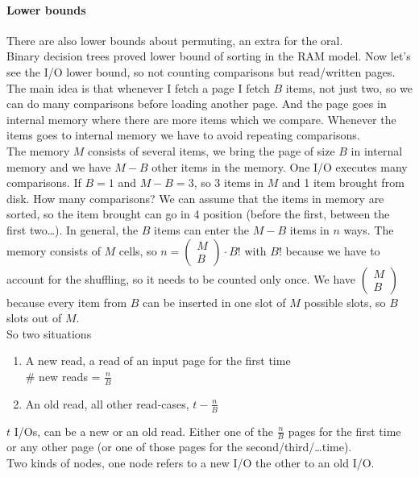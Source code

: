 \documentclass[10pt]{report}
\begin{document}
\paragraph{Lower bounds} There are also lower bounds about permuting, an extra for the oral.\\
Binary decision trees proved lower bound of sorting in the RAM model. Now let's see the I/O lower bound, so not counting comparisons but read/written pages. The main idea is that whenever I fetch a page I fetch $B$ items, not just two, so we can do many comparisons before loading another page. And the page goes in internal memory where there are more items which we compare. Whenever the items goes to internal memory we have to avoid repeating comparisons.\\
The memory $M$ consists of several items, we bring the page of size $B$ in internal memory and we have $M-B$ other items in the memory. One I/O executes many comparisons. If $B = 1$ and $M - B = 3$, so 3 items in $M$ and 1 item brought from disk. How many comparisons? We can assume that the items in memory are sorted, so the item brought can go in 4 position (before the first, between the first two\ldots). In general, the $B$ items can enter the $M-B$ items in $n$ ways. The memory consists of $M$ cells, so $n = \left(\begin{array}{c}
M\\B
\end{array}\right)\cdot B!$ with $B!$ because we have to account for the shuffling, so it needs to be counted only once. We have $\left(\begin{array}{c}
M\\B
\end{array}\right)$ because every item from $B$ can be inserted in one slot of $M$ possible slots, so $B$ slots out of $M$.\\
So two situations \begin{enumerate}
	\item A new read, a read of an input page for the first time\\
	\# new reads = $\frac{n}{B}$
	\item An old read, all other read-cases, $t - \frac{n}{B}$
\end{enumerate}
$t$ I/Os, can be a new or an old read. Either one of the $\frac{n}{B}$ pages for the first time or any other page (or one of those pages for the second/third/\ldots time).\\
Two kinds of nodes, one node refers to a new I/O the other to an old I/O.\\
\end{document}
